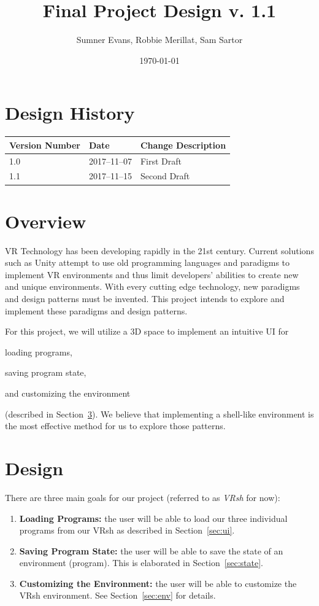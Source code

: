 \documentclass[titlepage,12pt]{article}
\title{Final Project Design v. 1.1}
\author{Sumner Evans, Robbie Merillat, Sam Sartor}
\date{\today}
\newcommand\name{VRsh}
\begin{document}
\maketitle

\section{Design History}
\begin{tabularx}{\linewidth}{| l | l || X |}
    \hline
    \textbf{Version Number} & \textbf{Date} & \textbf{Change Description} \\
    \hline\hline
    1.0 & 2017--11--07 & First Draft \\
    \hline
    1.1 & 2017--11--15 & Second Draft \\
    \hline
\end{tabularx}

\section{Overview}
VR Technology has been developing rapidly in the 21st century. Current solutions
such as Unity attempt to use old programming languages and paradigms to
implement VR environments and thus limit developers' abilities to create new and
unique environments. With every cutting edge technology, new paradigms and
design patterns must be invented. This project intends to explore and implement
these paradigms and design patterns.

For this project, we will utilize a 3D space to implement an intuitive UI for
\begin{enumerate*}[label={(\alph*)}]
    \item loading programs,
    \item saving program state,
    \item and customizing the environment
\end{enumerate*} (described in Section~\ref{sec:design}).  We believe that
implementing a shell-like environment is the most effective method for us to
explore those patterns.

\section{Design}\label{sec:design}
There are three main goals for our project (referred to as \textit{\name} for
now):
\begin{enumerate}
    \item \textbf{Loading Programs:} the user will be able to load our three
        individual programs from our {\name} as described in Section~\ref{sec:ui}.
    \item \textbf{Saving Program State:} the user will be able to save the state
        of an environment (program). This is elaborated in
        Section~\ref{sec:state}.
    \item \textbf{Customizing the Environment:} the user will be able to
        customize the {\name} environment. See Section~\ref{sec:env} for details.
\end{enumerate}
\end{document}
